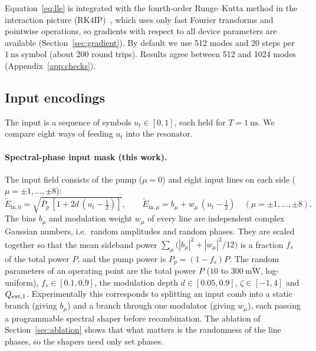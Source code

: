 Equation~\eqref{eq:lle} is integrated with the fourth-order Runge--Kutta method in the interaction picture
(RK4IP)~\cite{hult2007}, which uses only fast Fourier transforms and pointwise operations, so gradients with respect to all device
parameters are available (Section~\ref{sec:gradient}).
By default we use 512 modes and 20 steps per $1~\mathrm{ns}$ symbol (about 200 round trips).
Results agree between 512 and 1024 modes (Appendix~\ref{app:checks}).

\subsection{Input encodings}\label{sec:encodings-def}

The input is a sequence of symbols $u_t\in[0,1]$, each held for $T=1~\mathrm{ns}$. We compare eight ways of feeding $u_t$ into the
resonator.

\paragraph{Spectral-phase input mask (this work).}
The input field consists of the pump ($\mu=0$) and eight input lines on each side ($\mu=\pm1,\dots,\pm8$):
\begin{equation}
\tilde E_{\mathrm{in},0}=\sqrt{P_p\,[1+2d\,(u_t-\tfrac12)]},\qquad
\tilde E_{\mathrm{in},\mu}=b_\mu+w_\mu\,(u_t-\tfrac12)\quad(\mu=\pm1,\dots,\pm8).
\label{eq:mask}
\end{equation}
The bias $b_\mu$ and modulation weight $w_\mu$ of every line are independent complex Gaussian numbers, i.e.\ random amplitudes and
random phases. They are scaled together so that the mean sideband power $\sum_\mu\big(|b_\mu|^{2}+|w_\mu|^{2}/12\big)$ is a fraction
$f_s$ of the total power $P$, and the pump power is $P_p=(1-f_s)P$.
The random parameters of an operating point are the total power $P$ ($10$ to $300~\mathrm{mW}$, log-uniform), $f_s\in[0.1,0.9]$,
the modulation depth $d\in[0.05,0.9]$, $\zeta\in[-1,4]$ and $Q_{\mathrm{ext},1}$.
Experimentally this corresponds to splitting an input comb into a static branch (giving $b_\mu$) and a branch through one modulator
(giving $w_\mu$), each passing a programmable spectral shaper before recombination. The ablation of Section~\ref{sec:ablation}
shows that what matters is the randomness of the line phases, so the shapers need only set phases.

